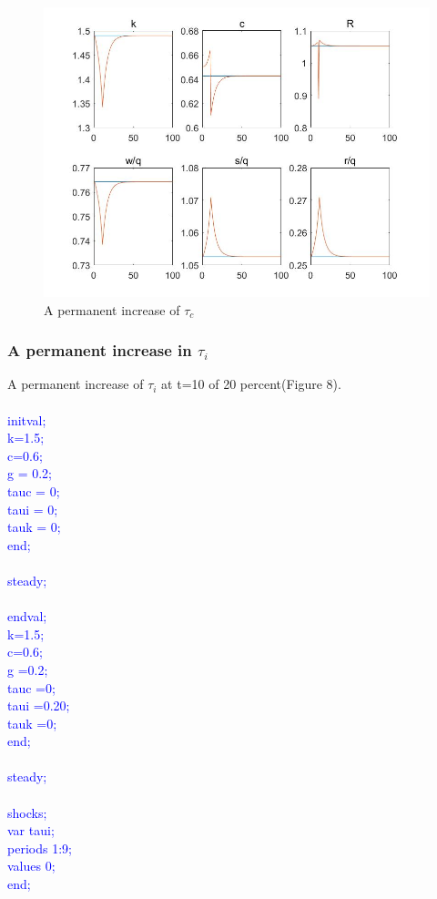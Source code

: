 \documentclass[a4paper,12pt]{scrartcl} %
\begin{document}
\begin{figure}[htbp!]
		\centering
			\includegraphics[width=0.8\linewidth]{fig7.jpg}
            \caption{A permanent increase of $\tau_c$}\label{6}
\end{figure}

\subsubsection{A permanent increase in $\tau_i$}

A permanent increase of $\tau_i$ at t=10 of 20 percent(Figure 8).\\
\\
\textcolor{blue}{
initval;\\
k=1.5;\\
c=0.6;\\
g = 0.2;\\
tauc = 0;\\
taui = 0;\\
tauk = 0;\\
end;\\
\\
steady;\\
\\
endval;\\
k=1.5;\\
c=0.6;\\
g =0.2;\\
tauc =0;\\
taui =0.20;\\
tauk =0;\\
end;\\
\\
steady;\\
\\
shocks;\\
var taui;\\
periods 1:9;\\
values 0;\\
end;}\\
\end{document}
